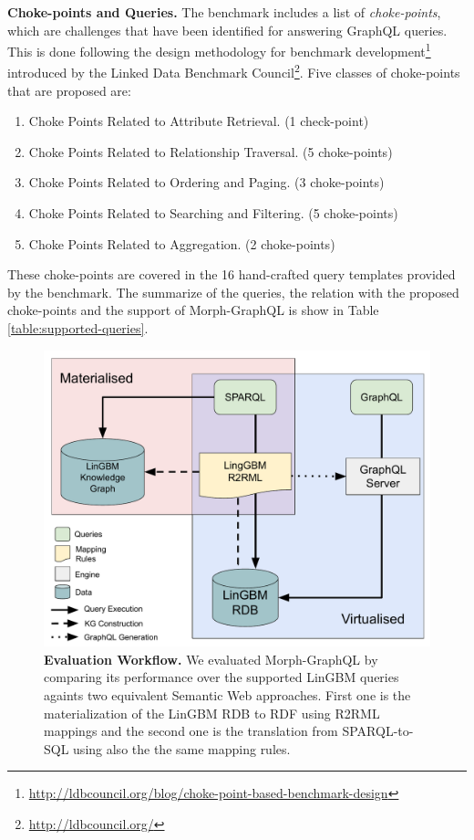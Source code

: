 \textbf{Choke-points and Queries.} 
The benchmark includes a list of \textit{choke-points}, which are challenges that have been identified for answering GraphQL queries. This is done following the design methodology for benchmark development\footnote{\url{http://ldbcouncil.org/blog/choke-point-based-benchmark-design}} introduced by the Linked Data Benchmark Council\footnote{\url{http://ldbcouncil.org/}}. Five classes of choke-points that are proposed are: 
\begin{enumerate}
    \item Choke Points Related to Attribute Retrieval. (1 check-point)
    \item Choke Points Related to Relationship Traversal. (5 choke-points)
    \item Choke Points Related to Ordering and Paging. (3 choke-points)
    \item Choke Points Related to Searching and Filtering. (5 choke-points)
    \item Choke Points Related to Aggregation. (2 choke-points)
\end{enumerate}

These choke-points are covered in the 16 hand-crafted query templates provided by the benchmark. The summarize of the queries, the relation with the proposed choke-points and the support of Morph-GraphQL is show in Table \ref{table:supported-queries}.


\begin{figure}[ht]
    \centering
    \includegraphics[width=.8\linewidth]{figures/evaluation.pdf}
    \caption[Morph-GraphQL evaluation workflow.]{\textbf{Evaluation Workflow.} We evaluated Morph-GraphQL by comparing its performance over the supported LinGBM queries againts two equivalent Semantic Web approaches. First one is the materialization of the LinGBM RDB to RDF using R2RML mappings and the second one is the translation from SPARQL-to-SQL using also the the same mapping rules.}
    \label{fig:eval-workflow}
\end{figure}

